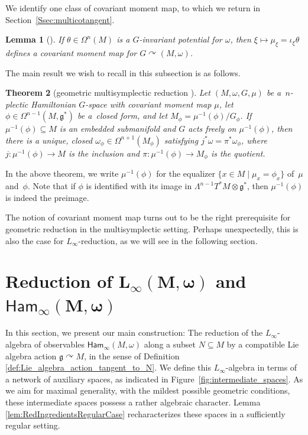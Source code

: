\documentclass[pdftex]{sigma}
\numberwithin{equation}{section}
\newtheorem{Theorem}{Theorem}[section]
\newtheorem{Lemma}[Theorem]{Lemma}
\newcommand{\g}{\mathfrak{g}}
\newcommand{\Ham}{\mathsf{Ham}}
\renewcommand{\subset}{\subseteq}
\begin{document}
We identify one class of covariant moment map, to which we return in Section~\ref{Ssec:multicotangent}.

\begin{Lemma}[{\cite[Section~8.1]{CalliesFregierRogersZambon16}}]\label{lem:potinducesmom}
	If $\theta\in\Omega^n(M)$ is a $G$-invariant potential for $\omega$, then $\xi\mapsto\mu_\xi=\iota_\xi\theta$ defines a covariant moment map for $G\curvearrowright(M,\omega)$.
\end{Lemma}

The main result we wish to recall in this subsection is as follows.

\begin{Theorem}[geometric multisymplectic reduction {\cite[Theorem~1]{Blacker21}}]\label{thm:CaseyReduction}
	Let $(M,\omega,G,\mu)$ be a~$n$-plectic Hamiltonian $G$-space with covariant moment map $\mu$, let $\phi\in\Omega^{n-1}(M,\g^*)$ be a~closed form, and let $M_\phi= \mu^{-1}(\phi)/G_\phi$. If $\mu^{-1}(\phi)\subset M$ is an embedded submanifold and $G$ acts freely on $\mu^{-1}(\phi)$, then there is a unique, closed $\omega_\phi\in\Omega^{n+1}(M_\phi)$ satisfying $j^*\omega = \pi^*\omega_\phi$, where $j\colon \mu^{-1}(\phi)\to M$ is the inclusion and $\pi\colon \mu^{-1}(\phi)\to M_\phi$ is the quotient.
\end{Theorem}

In the above theorem, we write $\mu^{-1}(\phi)$ for the equalizer $\{x\in M \mid  \mu_x=\phi_x\}$ of~$\mu$ and~$\phi$. Note that if $\phi$ is identified with its image in $\Lambda^{n-1}T^*M\otimes\g^*$, then $\mu^{-1}(\phi)$ is indeed the pre\-image.

The notion of covariant moment map turns out to be the right prerequisite for geometric reduction in the multisymplectic setting. Perhaps unexpectedly, this is also the case for $L_\infty$-reduction, as we will see in the following section.

\section[Reduction of L\_infty(M,omega) and Ham\_infty(M,omega)]{Reduction of $\boldsymbol{L_\infty(M,\omega)}$ and $\boldsymbol{\Ham_\infty(M,\omega)}$}\label{Sec:CoreSection}

In this section, we present our main construction: The reduction of the $L_\infty$-algebra of observables $\Ham_\infty(M,\omega)$ along a subset $N\subset M$ by a compatible Lie algebra action $\g\curvearrowright M$, in the sense of Definition \ref{def:Lie_algebra_action_tangent_to_N}. We define this $L_\infty$-algebra in terms of a network of auxiliary spaces, as indicated in Figure~\ref{fig:intermediate_spaces}. As we aim for maximal generality, with the mildest possible geometric conditions, these intermediate spaces possess a rather algebraic character. Lemma \ref{lem:RedIngredientsRegularCase} recharacterizes these spaces in a sufficiently regular setting.
\end{document}
